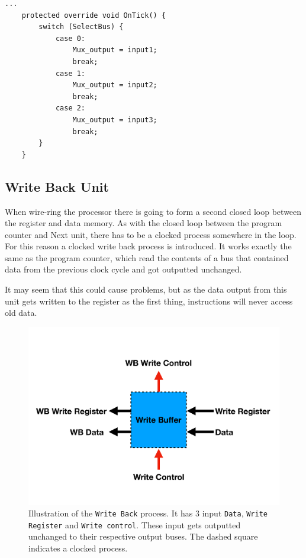         \begin{minipage}{\linewidth}
            \begin{lstlisting}[language={[Sharp]C}, caption={An example of a \texttt{Multiplexer} process SME code. The whole multiplexer simply consists of a \texttt{switch} statement that selects an input to output dependent on \texttt{SelectBus}.},captionpos=b, label = MUX]
...
    protected override void OnTick() {
        switch (SelectBus) {
            case 0:
                Mux_output = input1;
                break;
            case 1:
                Mux_output = input2; 
                break;
            case 2:
                Mux_output = input3; 
                break;
        }
    }
            \end{lstlisting}
        \end{minipage}
    
    \subsection{Write Back Unit}
        When wire-ring the processor there is going to form a second closed loop between the register and data memory. As with the closed loop between the program counter and Next unit, there has to be a clocked process somewhere in the loop. For this reason a clocked write back process is introduced. It works exactly the same as the program counter, which read the contents of a bus that contained data from the previous clock cycle and got outputted unchanged. 
        
        It may seem that this could cause problems, but as the data output from this unit gets written to the register as the first thing, instructions will never access old data.  
        
        \begin{figure}[h!]
            \centering
            \includegraphics[scale=0.35]{pictures/WB.pdf}
            \caption{Illustration of the \texttt{Write Back} process. It has 3 input \texttt{Data}, \texttt{Write Register} and \texttt{Write control}. These input gets outputted unchanged to their respective output buses. The dashed square indicates a clocked process.}
            \label{fig:WB}
        \end{figure}
    
